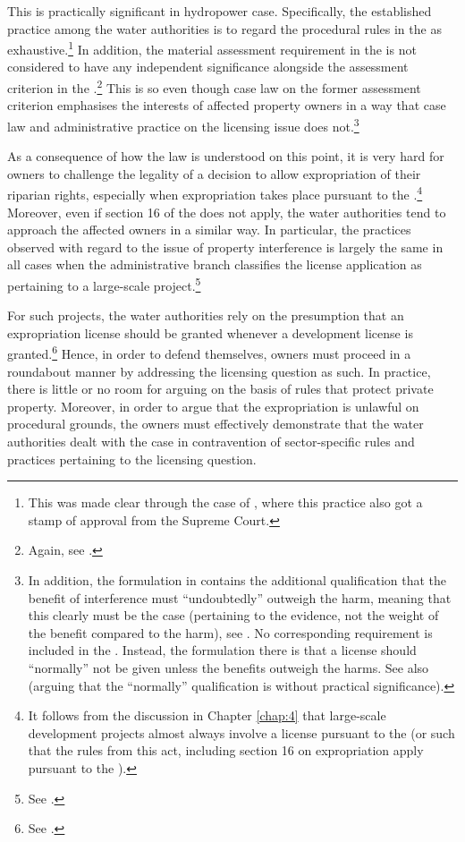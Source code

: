 This is practically significant in hydropower case. Specifically, the established practice among the water authorities is to regard the procedural rules in the \cite{wra17} as exhaustive.\footnote{This was made clear through the case of \cite{jorpeland11}, where this practice also got a stamp of approval from the Supreme Court.} In addition, the material assessment requirement in the \cite{ea59} is not considered to have any independent significance alongside the assessment criterion in the \cite{wra17}.\footnote{Again, see \cite{jorpeland11}.} This is so even though case law on the former assessment criterion emphasises the interests of affected property owners in a way that case law and administrative practice on the licensing issue does not.\footnote{In addition, the formulation in \cite[2]{ea59} contains the additional qualification that the benefit of interference must ``undoubtedly'' outweigh the harm, meaning that this clearly must be the case (pertaining to the evidence, not the weight of the benefit compared to the harm), see \cite{lovenskiold09}. No corresponding requirement is included in the \cite[8]{wra17}. Instead, the formulation there is that a license should ``normally'' not be given unless the benefits outweigh the harms. See also \cite[325-236]{haagensen02} (arguing that the ``normally'' qualification is without practical significance).}

As a consequence of how the law is understood on this point, it is very hard for owners to challenge the legality of a decision to allow expropriation of their riparian rights, especially when expropriation takes place pursuant to the \cite{wra17}.\footnote{It follows from the discussion in Chapter \ref{chap:4} that large-scale development projects almost always involve a license pursuant to the \cite{wra17} (or such that the rules from this act, including section 16 on expropriation apply pursuant to the \cite{wra00}).} Moreover, even if section 16 of the \cite{wra17} does not apply, the water authorities tend to approach the affected owners in a similar way. In particular, the practices observed with regard to the issue of property interference is largely the same in all cases when the administrative branch classifies the license application as pertaining to a large-scale project.\footnote{See \cite{flatby08}.}

For such projects, the water authorities rely on the presumption that an expropriation license should be granted whenever a development license is granted.\footnote{See \cite{flatby08}.} Hence, in order to defend themselves, owners must proceed in a roundabout manner by addressing the licensing question as such. In practice, there is little or no room for arguing on the basis of rules that protect private property. Moreover, in order to argue that the expropriation is unlawful on procedural grounds, the owners must effectively demonstrate that the water authorities dealt with the case in contravention of sector-specific rules and practices pertaining to the licensing question.

